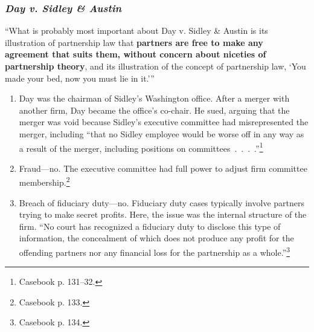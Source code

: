 \subsubsection{\emph{Day v. Sidley \& Austin}}

\enquote{What is probably most important about Day v. Sidley \& Austin is its 
illustration of partnership law that \textbf{partners are free to make any agreement 
that suits them, without concern about niceties of partnership theory}, and 
its illustration of the concept of partnership law, \enquote{You made your 
bed, now you must lie in it.}}

\begin{enumerate}
    \item Day was the chairman of Sidley's Washington office. After a merger 
    with another firm, Day became the office's co-chair. He sued, arguing that 
    the merger was void because Sidley's executive committee had 
    misrepresented the merger, including ``that no Sidley employee would be 
    worse off in any way as a result of the merger, including positions on 
    committees~.~.~.~.''\footnote{Casebook p. 131--32.}
    \item Fraud---no. The executive committee had full power to adjust firm 
    committee membership.\footnote{Casebook p. 133.}
    \item Breach of fiduciary duty---no. Fiduciary duty cases typically 
    involve partners trying to make secret profits. Here, the issue was the 
    internal structure of the firm. ``No court has recognized a fiduciary duty 
    to disclose this type of information, the concealment of which does not 
    produce any profit for the offending partners nor any financial loss for 
    the partnership as a whole.''\footnote{Casebook p. 134.}
\end{enumerate}
